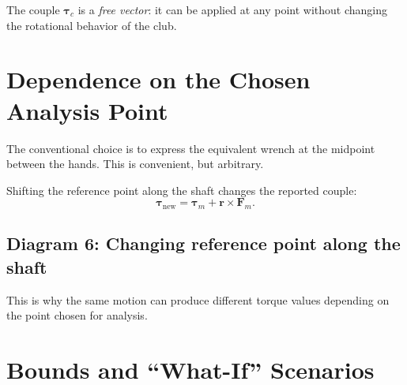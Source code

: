 \documentclass[12pt]{article}
\begin{document}
The couple $\bm{\tau}_c$ is a \emph{free vector}: it can be applied at any point without changing the rotational behavior of the club.

\section{Dependence on the Chosen Analysis Point}

The conventional choice is to express the equivalent wrench at the midpoint between the hands.  
This is convenient, but arbitrary.

Shifting the reference point along the shaft changes the reported couple:
\[
\bm{\tau}_{\mathrm{new}} = \bm{\tau}_m + \mathbf{r}\times\mathbf{F}_m.
\]

\subsection*{Diagram 6: Changing reference point along the shaft}

\begin{center}
\end{center}

This is why the same motion can produce different torque values depending on the point chosen for analysis.

\section{Bounds and “What-If” Scenarios}
\end{document}
